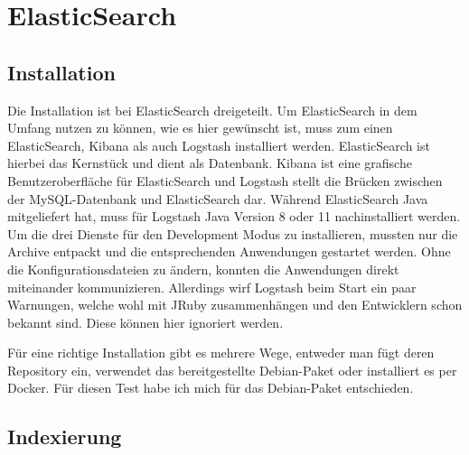 
\section{ElasticSearch}

\subsection{Installation}

Die Installation ist bei ElasticSearch dreigeteilt. Um ElasticSearch in dem Umfang nutzen zu können, wie es hier gewünscht ist, muss zum einen ElasticSearch, Kibana als auch Logstash installiert werden. ElasticSearch ist hierbei das Kernstück und dient als Datenbank. Kibana ist eine grafische Benutzeroberfläche für ElasticSearch und Logstash stellt die Brücken zwischen der MySQL-Datenbank und ElasticSearch dar. Während ElasticSearch Java mitgeliefert hat, muss für Logstash Java Version 8 oder 11 nachinstalliert werden. Um die drei Dienste für den Development Modus zu installieren, mussten nur die Archive entpackt und die entsprechenden Anwendungen gestartet werden. Ohne die Konfigurationsdateien zu ändern, konnten die Anwendungen direkt miteinander kommunizieren. Allerdings wirf Logstash beim Start ein paar Warnungen, welche wohl mit JRuby zusammenhängen und den Entwicklern schon bekannt sind. Diese können hier ignoriert werden.

Für eine richtige Installation gibt es mehrere Wege, entweder man fügt deren Repository ein, verwendet das bereitgestellte Debian-Paket oder installiert es per Docker. Für diesen Test habe ich mich für das Debian-Paket entschieden. 

\subsection{Indexierung}

